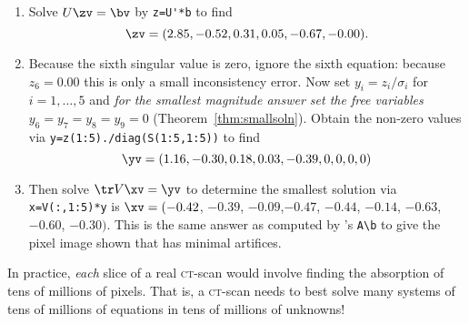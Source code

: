 \begin{example}
\begin{enumerate}
\item Solve \(U\zv=\bv\) by \verb|z=U'*b| to find
\begin{equation*}
\zv=(2.85,-0.52, 0.31, 0.05,-0.67,-0.00).
\end{equation*}

\item Because the sixth singular value is zero, ignore the sixth equation: because \(z_6=0.00\) this is only a small inconsistency error.
Now set $y_i=z_i/\sigma_i$ for \(i=1,\ldots,5\) and \emph{for the smallest magnitude answer set the free variables} \(y_6=y_7=y_8=y_9=0\) (Theorem~\ref{thm:smallsoln}).
Obtain the non-zero values via \verb|y=z(1:5)./diag(S(1:5,1:5))| to find
\begin{equation*}
\yv=(1.16,-0.30, 0.18, 0.03,-0.39,0,0,0,0)
\end{equation*}

\item Then solve \(\tr V\xv=\yv\) to determine the smallest solution via \verb|x=V(:,1:5)*y| is
\(\xv= (-0.42\), \(-0.39\), \(-0.09\),\( -0.47\), \(-0.44\), \(-0.14\), \(-0.63\), \(-0.60\), \(-0.30)\).
This is the same answer as computed by \script[2]'s \verb|A\b| to give the pixel image shown that has minimal artifices.
\end{enumerate}
In practice, \emph{each} slice of a real \textsc{ct}-scan would involve finding the absorption of tens of millions of pixels.
That is, a \textsc{ct}-scan needs to best solve many systems of tens of millions of equations in tens of millions of unknowns!
\end{example}



%






